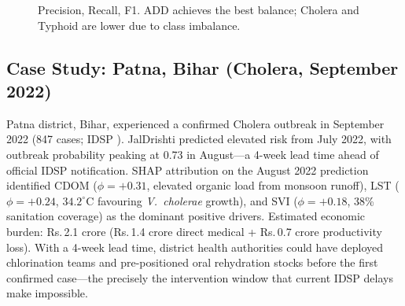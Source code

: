 \documentclass[conference]{IEEEtran}
\begin{document}
\begin{figure}[!t]
\centering
{}
\caption{Precision, Recall, F1. ADD achieves the best balance; Cholera and Typhoid are lower due to class imbalance.}
\label{fig:pr}
\end{figure}

\subsection{Case Study: Patna, Bihar (Cholera, September 2022)}

Patna district, Bihar, experienced a confirmed Cholera outbreak in
September 2022 (847 cases; IDSP \cite{idsp2025}). JalDrishti predicted
elevated risk from July 2022, with outbreak probability peaking at 0.73
in August---a 4-week lead time ahead of official IDSP notification.
SHAP attribution on the August 2022 prediction identified CDOM
($\phi = +0.31$, elevated organic load from monsoon runoff), LST
($\phi = +0.24$, $34.2^\circ$C favouring \textit{V.~cholerae} growth),
and SVI ($\phi = +0.18$, 38\% sanitation coverage) as the dominant
positive drivers. Estimated economic burden: Rs.\,2.1 crore (Rs.\,1.4
crore direct medical + Rs.\,0.7 crore productivity loss). With a 4-week
lead time, district health authorities could have deployed chlorination
teams and pre-positioned oral rehydration stocks before the first
confirmed case---the precisely the intervention window that current
IDSP delays make impossible.

\end{document}

